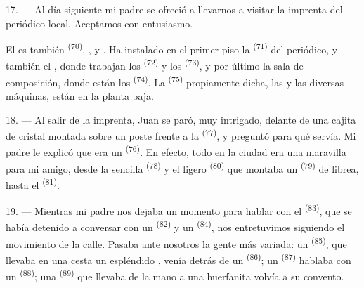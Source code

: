 \VUsaut{3.0mm}

17. --- Al día siguiente mi padre se ofreció a llevarnos a visitar la
imprenta del periódico local. Aceptamos con entusiasmo.

El  es también  \textsuperscript{(70)},
,  y . Ha instalado en
el primer piso la  \textsuperscript{(71)} del periódico, y también
el , donde trabajan los 
\textsuperscript{(72)} y los  \textsuperscript{(73)}, y por
último la sala de composición, donde están los 
\textsuperscript{(74)}. La  \textsuperscript{(75)} propiamente
dicha, las  y las diversas máquinas, están en la planta
baja.

\VUsaut{3.0mm}

18. --- Al salir de la imprenta, Juan se paró, muy intrigado, delante de
una cajita de cristal montada sobre un poste frente a la
 \textsuperscript{(77)}, y preguntó para qué servía. Mi padre le
explicó que era un  \textsuperscript{(76)}. En efecto,
todo en la ciudad era una maravilla para mi amigo, desde la sencilla
 \textsuperscript{(78)} y el ligero
 \textsuperscript{(80)} que montaba un 
\textsuperscript{(79)} de librea, hasta el  \textsuperscript{(81)}.

19. --- Mientras mi padre nos dejaba un momento para hablar con el
 \textsuperscript{(83)}, que se había detenido a
conversar con un  \textsuperscript{(82)} y un 
\textsuperscript{(84)}, nos entretuvimos siguiendo el movimiento de la calle. Pasaba
ante nosotros la gente más variada: un 
\textsuperscript{(85)}, que llevaba en una cesta un espléndido , venía
detrás de un  \textsuperscript{(86)}; un 
\textsuperscript{(87)} hablaba con un  \textsuperscript{(88)}; una
 \textsuperscript{(89)} que llevaba de la mano a una huerfanita volvía
a su convento.

\VUsaut{3.0mm}

